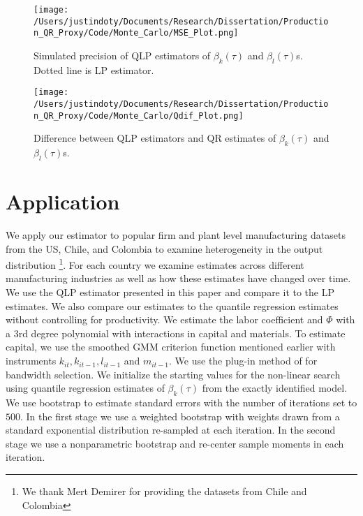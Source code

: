 \documentclass[11pt]{article}
\begin{document}


\begin{figure}[H]
\centering
\caption{Simulated precision of  QLP estimators of $\beta_{k}(\tau)$ and $\beta_{l}(\tau)$s. Dotted line is LP estimator.}
\texttt{[image: /Users/justindoty/Documents/Research/Dissertation/Production\_QR\_Proxy/Code/Monte\_Carlo/MSE\_Plot.png]}
\label{fig:MSE}
\end{figure}

\begin{figure}[ht]
\centering
\caption{Difference between QLP estimators and QR estimates of $\beta_{k}(\tau)$ and $\beta_{l}(\tau)$s.}
\texttt{[image: /Users/justindoty/Documents/Research/Dissertation/Production\_QR\_Proxy/Code/Monte\_Carlo/Qdif\_Plot.png]}
\label{fig:QDIF}
\end{figure}

\newpage
\section{Application} \label{application}
We apply our estimator to popular firm and plant level manufacturing datasets from the US, Chile, and Colombia to examine heterogeneity in the output distribution \footnote{We thank Mert Demirer for providing the datasets from Chile and Colombia}. For each country we examine estimates across different manufacturing industries as well as how these estimates have changed over time. We use the QLP estimator presented in this paper and compare it to the LP estimates. We also compare our estimates to the quantile regression estimates without controlling for productivity. We estimate the labor coefficient and $\Phi$ with a 3rd degree polynomial with interactions in capital and materials. To estimate capital, we use the smoothed GMM criterion function mentioned earlier with instruments $k_{it}, k_{it-1}, l_{it-1}$ and $m_{it-1}$. We use the plug-in method of \cite{Kaplan2016} for bandwidth selection. We initialize the starting values for the non-linear search using quantile regression estimates of $\beta_{k}(\tau)$ from the exactly identified model. We use bootstrap to estimate standard errors with the number of iterations set to $500$. In the first stage we use a weighted bootstrap with weights drawn from a standard exponential distribution re-sampled at each iteration. In the second stage we use a nonparametric bootstrap and re-center sample moments in each iteration.
\end{document}
